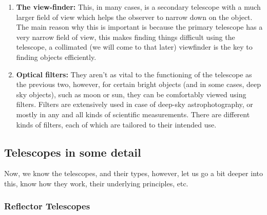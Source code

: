 \documentclass[a4paper,twoside]{article}
\numberwithin{equation}{section}
\begin{document}
\begin{enumerate}
{\begin{enumerate}
\item \textbf{The view-finder:} This, in many cases, is a secondary telescope with a much larger field of view which helps the observer to narrow down on the object. The main reason why this is important is because the primary telescope has a very narrow field of view, this makes finding things difficult using the telescope, a collimated (we will come to that later) viewfinder is the key to finding objects efficiently. 

\item \textbf{Optical filters:} They aren't as vital to the functioning of the telescope as the previous two, however, for certain bright objects (and in some cases, deep sky objects), such as moon or sun, they can be comfortably viewed using filters. Filters are extensively used in case of deep-sky astrophotography, or mostly in any and all kinds of scientific measurements. There are different kinds of filters, each of which are tailored to their intended use.  
\end{enumerate}
}
\end{enumerate}
\newpage
\subsection{Telescopes in some detail}
Now, we know the telescopes, and their types, however, let us go a bit deeper into this, know how they work, their underlying principles, etc.
\subsubsection{Reflector Telescopes}
\end{document}
